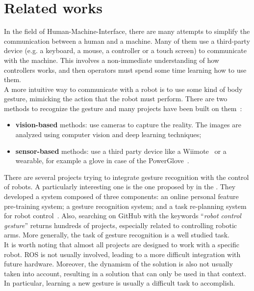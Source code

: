 \documentclass[../thesis.tex]{subfiles}
\begin{document}
\section{Related works}
In the field of Human-Machine-Interface, there are many attempts to simplify the communication between a human and a machine. Many of them use a third-party device (e.g. a keyboard, a mouse, a controller or a touch screen) to communicate with the machine. This involves a non-immediate understanding of how controllers works, and then operators must spend some time learning how to use them.\\

A more intuitive way to communicate with a robot is to use some kind of body gesture, mimicking the action that the robot must perform. There are two methods to recognize the gesture and many projects have been built on them~\cite{paper:design_and_evaluate_hand_gesture}:
\begin{itemize}
    \item \textbf{vision-based} methods: use cameras to capture the reality. The images are analyzed using computer vision and deep learning techniques;
    \item \textbf{sensor-based} methods: use a third party device like a Wiimote~\cite{paper:guo2008exploring} or a wearable, for example a glove in case of the PowerGlove~\cite{paper:kessler1995evaluation}.
\end{itemize}

There are several projects trying to integrate gesture recognition with the control of robots. A particularly interesting one is the one proposed by \citeauthor{paper:chen2019online} in the \citeyear{paper:chen2019online}.  They developed a system composed of three components: an online personal feature pre-training system; a gesture recognition system; and a task re-planning system for robot control~\cite{paper:chen2019online}. Also, searching on GitHub with the keywords ``\textit{robot control gesture}'' returns hundreds of projects, especially related to controlling robotic arms. More generally, the task of gesture recognition is a well studied task.\\

It is worth noting that almost all projects are designed to work with a specific robot. \gls{ROS} is not usually involved, leading to a more difficult integration with future hardware. Moreover, the dynamism of the solution is also not usually taken into account, resulting in a solution that can only be used in that context. In particular, learning a new gesture is usually a difficult task to accomplish.
\end{document}
